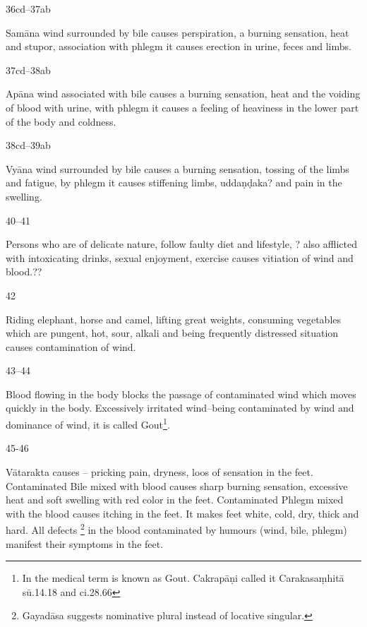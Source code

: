 \begin{translation}
\item[36cd--37ab]

	Samāna wind surrounded by bile causes perspiration, a burning sensation,
	heat and stupor, association with phlegm it causes erection in urine,
	feces and limbs.  

\item[37cd--38ab]

	Apāna wind associated with bile causes a burning sensation, heat and the
	voiding of blood with urine, with phlegm it causes a feeling of
	heaviness in the lower part of the body and coldness.

\item[38cd--39ab]

	Vyāna wind surrounded by bile causes a burning sensation, tossing of the
	limbs and fatigue, by phlegm it causes stiffening limbs, uddaṇḍaka? and
	pain in the swelling.

\item[40--41]

	Persons who are of delicate nature, follow faulty diet and lifestyle, ?
	also afflicted with intoxicating drinks, 	sexual enjoyment,
	exercise causes vitiation of wind and blood.??

\item[42]

	Riding elephant, horse and camel, lifting great weights, consuming
	vegetables which are pungent, hot, sour, alkali and being frequently
	distressed situation causes contamination of wind. 

\item[43--44]

	Blood flowing in the body blocks the passage of contaminated wind which
	moves quickly in the body. Excessively irritated wind--being
	contaminated by wind and dominance of wind, it is called 
	Gout\footnote{In the medical term  is known as Gout.
	Cakrapāṇi called it  Carakasaṃhitā sū.14.18 and ci.28.66}.

\item[45-46]

	Vātarakta causes -- pricking pain, dryness, loos of sensation in the
	feet. Contaminated Bile mixed with blood causes sharp burning sensation,
	excessive heat and soft swelling with red color in the feet.
	Contaminated Phlegm mixed with the blood causes itching in the feet. It
	makes feet white, cold, dry, thick and hard. All defects
	\footnote{Gayadāsa suggests  nominative plural
	instead of locative singular.} in the blood contaminated by humours
	(wind, bile, phlegm) manifest their symptoms in the feet.


\end{translation}
